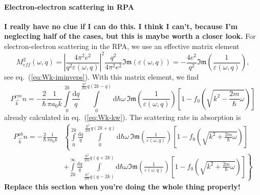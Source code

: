 \documentclass[physics,phd,nolot,nolof]{uccthesis}%
\newcommand{\alert}[1]{\textbf{\color{red}#1}}
\begin{document}
{%
\paragraph*{Electron-electron scattering in RPA}
\alert{I really have no clue if I can do this. I think I can't, because 
I'm neglecting half of the cases, but this is maybe worth a closer look.}
For electron-electron scattering in the RPA, we use an effective matrix element
\begin{equation}
  M_{eff}^2(\omega,q) = |\frac{4\pi^2 e^2}{q^2 \varepsilon(\omega,q)}|^2
  \frac{q^2}{4\pi^2 e^2}\mathfrak{Im}(\varepsilon(\omega,q))
  =-\frac{4e^2 }{q^2}\mathfrak{Im}(\frac{1}{\varepsilon(\omega,q)}), 
  \label{eq:M_eff}
\end{equation}
see eq.~(\ref{eq:Wk-iminveps}).
With this matrix element, we find
\begin{equation}
  P^{em}_{\vec k}n 
  =-\frac{2}{\hbar}
  \frac{1}{\pi a_0k}
  \int\limits_0^{2k}\frac{\mathrm{d}q}{ q}
  \int\limits_{0}^{\frac{\hbar^2}{2m}q\left(2k-q\right)}\!\!\!\!\!\!\mathrm{d}\hbar\omega\,
\mathfrak{Im}\left(\frac{1}{\varepsilon(\omega,q)}\right) 
\left[1-f_0\left( \sqrt{k^2 -\frac{2m}{\hbar}\omega}\right)\right] 
  \label{eq:Scattering-rate4}
\end{equation}
  already calculated in eq.~(\ref{eq:Wk-kw}).
The scattering rate in absorption is
\begin{equation}
  \begin{split}
  P^{ab}_{\vec k}n 
  =-\frac{2}{\hbar}
  \frac{1}{\pi a_0k}
&  \left\{
\int\limits_0^{2k} \frac{\mathrm{d}q}{ q}
  \int\limits_{0}^{\frac{\hbar^2}{2m}q\left(2k+q\right)}\!\!\!\!\!\!\mathrm{d}\hbar\omega\,
\mathfrak{Im}\left(\frac{1}{\varepsilon(\omega,q)}\right) 
\left[1-f_0\left( \sqrt{k^2 +\frac{2m}{\hbar}\omega}\right)\right] 
\right.\\
&\left. +\int\limits_{2k}^\infty \frac{\mathrm{d}q}{ q}
  \int\limits_{\frac{\hbar^2}{2m}q\left(q-2k\right)}^{\frac{\hbar^2}{2m}q\left(q+2k\right)}\!\!\!\!\!\!\mathrm{d}\hbar\omega 
\mathfrak{Im}\left(\frac{1}{\varepsilon(\omega,q)}\right) 
\left[1-f_0\left( \sqrt{k^2 +\frac{2m}{\hbar}\omega}\right)\right] 
\right\}
  \end{split}
  \label{eq:Scattering-rate4}
\end{equation}
  \alert{Replace this section when you're doing the whole thing properly!}

}
\end{document}
